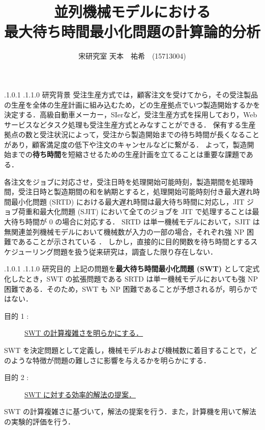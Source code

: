 \documentclass[oneside, 10pt, twocolumn]{jarticle}
\title{\bf{\rm
並列機械モデルにおける\\最大待ち時間最小化問題の計算論的分析}}
\author{宋研究室
\hspace{15pt}
天本　祐希　(15713004)}
\date{}
\makeatletter
\def\section{\@startsection {section}{1}{\z@}{-3.5ex plus -1ex minus
-.2ex}{2.3 ex plus .2ex}{\large\bf}}
\renewcommand{\section}{
\@startsection{section}{1}{\z@}
{.1\Cvs \@plus.0\Cdp \@minus.1\Cdp}%
{.1\Cvs \@plus.1\Cdp \@minus.0\Cdp}%
{\reset@font\large\bfseries}}      %
\makeatother
\begin{document}
\maketitle
\thispagestyle{empty}
\section{研究背景}
受注生産方式では，顧客注文を受けてから，その受注製品の生産を全体の生産計画に組み込むため，どの生産拠点でいつ製造開始するかを決定する．高級自動車メーカー，SIerなど，受注生産方式を採用しており，Web サービスなどタスク処理も受注生産方式とみなすことができる．
保有する生産拠点の数と受注状況によって，受注から製造開始までの待ち時間が長くなることがあり，顧客満足度の低下や注文のキャンセルなどに繋がる．
よって，製造開始までの{\bf 待ち時間}を短縮させるための生産計画を立てることは重要な課題である．

各注文をジョブに対応させ，受注日時を処理開始可能時刻，製造期間を処理時間，受注日時と製造期間の和を納期とすると，処理開始可能時刻付き最大遅れ時間最小化問題 (SRTD) における最大遅れ時間は最大待ち時間に対応し，JIT ジョブ荷重和最大化問題 (SJIT) において全てのジョブを JIT で処理することは最大待ち時間が 0 の場合に対応する． SRTD は単一機械モデルにおいて，SJIT は無関連並列機械モデルにおいて機械数が入力の一部の場合，それぞれ強 NP 困難であることが示されている \cite{SRTD}\cite{SJIT}．
しかし，直接的に目的関数を待ち時間とするスケジューリング問題を扱う従来研究は，調査した限り存在しない．

\section{研究目的}
上記の問題を{\bf 最大待ち時間最小化問題 (SWT) }として定式化したとき，SWT の拡張問題である SRTD は単一機械モデルにおいても強 NP  困難である．そのため，SWT も NP 困難であることが予想されるが，明らかではない．
\begin{description}
  \item[目的 1 :]
  \underline{SWT の計算複雑さを明らかにする．}
\end{description}
SWT を決定問題として定義し，機械モデルおよび機械数に着目することで，どのような特徴が問題の難しさに影響を与えるかを明らかにする．

\begin{description}
  \item[目的 2 :]
  \underline{SWT に対する効率的解法の提案．}
\end{description}
SWT の計算複雑さに基づいて，解法の提案を行う．また，計算機を用いて解法の実験的評価を行う．
\end{document}
